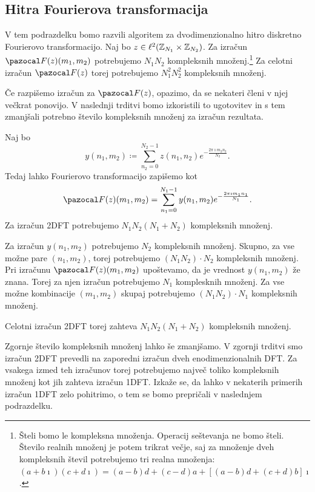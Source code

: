 \subsection{Hitra Fourierova transformacija}
V tem podrazdelku bomo razvili algoritem za dvodimenzionalno hitro diskretno Fouriero\-vo transformacijo.
Naj bo $z \in \ell^2(\mathbb Z_{N_1} \times \mathbb Z_{N_2})$. Za izračun $\F(z)(m_1, m_2)$ potrebujemo $N_1 N_2$ kompleksnih množenj.\footnote{Šteli bomo le kompleksna množenja. Operacij seštevanja ne bomo šteli. Število realnih množenj je potem trikrat večje, saj za množenje dveh kompleksnih števil potrebujemo tri realna množenja: $(a + b \imath)(c + d\imath) = (a - b)d + (c - d)a + [(a - b)d + (c + d)b]\imath$.} Za celotni izračun $\F(z)$ torej potrebujemo $N_1^2 N_2^2$ kompleksnih množenj.

Če razpišemo izračun za $\F(z)$, opazimo, da se nekateri členi v njej večkrat ponovijo. V naslednji trditvi bomo izkoristili to ugotovitev in s tem zmanjšali potrebno število kompleksnih množenj za izračun rezultata.
%
\begin{trditev} \label{trd:2dft}
Naj bo
$$y(n_1, m_2) \coloneqq \sum_{n_2 = 0}^{N_2 - 1} z(n_1, n_2) e^{-\frac{2\pi \imath m_2n_2}{N_2}}.$$
Tedaj lahko Fourierovo transformacijo zapišemo kot
$$\F(z)(m_1, m_2) = \sum_{n_1 = 0}^{N_1 - 1} y(n_1, m_2) e^{-\frac{2\pi \imath m_1n_1}{N_1}}.$$
Za izračun 2DFT potrebujemo $N_1 N_2 (N_1 + N_2)$ kompleksnih množenj.
\end{trditev}
%
\begin{dokaz}
Za izračun $y(n_1, m_2)$ potrebujemo $N_2$ kompleksnih množenj. Skupno, za vse možne pare $(n_1, m_2)$, torej potrebujemo $(N_1 N_2)\cdot N_2$ kompleksnih množenj. Pri izračunu $\F(z)(m_1, m_2)$ upoštevamo, da je vrednost $y(n_1, m_2)$ že znana. Torej za njen izračun potrebujemo $N_1$ komplesknih množenj. Za vse možne kombinacije $(m_1, m_2)$ skupaj potrebujemo $(N_1 N_2) \cdot N_1$ kompleksnih množenj.

Celotni izračun 2DFT torej zahteva $N_1 N_2 (N_1 + N_2)$ kompleksnih množenj. 
\end{dokaz}
%
Zgornje število kompleksnih množenj lahko še zmanjšamo. V zgornji trditvi smo izračun 2DFT prevedli na zaporedni izračun dveh enodimenzionalnih DFT. Za vsakega izmed teh izračunov torej potrebujemo največ toliko kompleksnih množenj kot jih zahteva izračun 1DFT. Izkaže se, da lahko v nekaterih primerih izračun 1DFT zelo pohitrimo, o tem se bomo prepričali v naslednjem podrazdelku. 
%
